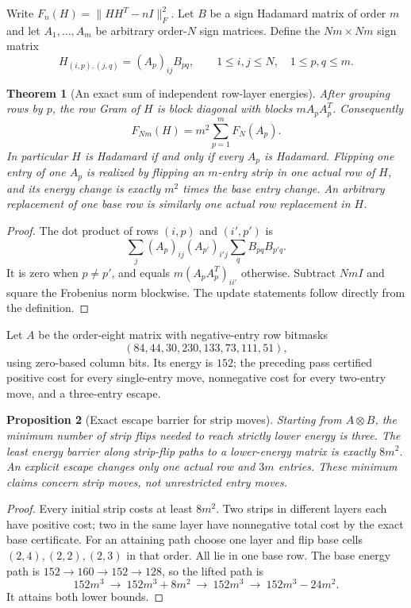 \documentclass[11pt]{article}
\newtheorem{theorem}{Theorem}[section]
\newtheorem{proposition}[theorem]{Proposition}
\begin{document}
Write $F_n(H)=\|HH^T-nI\|_F^2$. Let $B$ be a sign Hadamard matrix of
order $m$ and let $A_1,\ldots,A_m$ be arbitrary order-$N$ sign matrices.
Define the $Nm\times Nm$ sign matrix
\[
 H_{(i,p),(j,q)}=(A_p)_{ij}B_{pq},\qquad
 1\le i,j\le N,\quad1\le p,q\le m.
\]
\begin{theorem}[An exact sum of independent row-layer energies]
\label{thm:exchanges-layer-energy}
After grouping rows by $p$, the row Gram of $H$ is block diagonal with
blocks $mA_pA_p^T$. Consequently
\[
 F_{Nm}(H)=m^2\sum_{p=1}^m F_N(A_p).
\]
In particular $H$ is Hadamard if and only if every $A_p$ is Hadamard.
Flipping one entry of one $A_p$ is realized by flipping an $m$-entry
strip in one actual row of $H$, and its energy change is exactly
$m^2$ times the base entry change. An arbitrary replacement of one base
row is similarly one actual row replacement in $H$.
\end{theorem}
\begin{proof}
The dot product of rows $(i,p)$ and $(i',p')$ is
\[
 \sum_j(A_p)_{ij}(A_{p'})_{i'j}\sum_qB_{pq}B_{p'q}.
\]
It is zero when $p\ne p'$, and equals $m(A_pA_p^T)_{ii'}$ otherwise.
Subtract $NmI$ and square the Frobenius norm blockwise.
The update statements follow directly from the definition.
\end{proof}

Let $A$ be the order-eight matrix with negative-entry row bitmasks
\[
 (84,44,30,230,133,73,111,51),
\]
using zero-based column bits. Its energy is $152$; the preceding pass
certified positive cost for every single-entry move, nonnegative cost
for every two-entry move, and a three-entry escape.
\begin{proposition}[Exact escape barrier for strip moves]
\label{prop:exchanges-strip-barrier}
Starting from $A\otimes B$, the minimum number of strip flips needed
to reach strictly lower energy is three. The least energy barrier along
strip-flip paths to a lower-energy matrix is exactly $8m^2$.
An explicit escape changes only one actual row and $3m$ entries.
These minimum claims concern strip moves, not unrestricted entry moves.
\end{proposition}
\begin{proof}
Every initial strip costs at least $8m^2$. Two strips in different layers
each have positive cost; two in the same layer have nonnegative total
cost by the exact base certificate. For an attaining path choose one
layer and flip base cells $(2,4),(2,2),(2,3)$ in that order. All lie in
one base row. The base energy path is
$152\to160\to152\to128$, so the lifted path is
\[
 152m^3\ \longrightarrow\ 152m^3+8m^2\
 \longrightarrow\ 152m^3\
 \longrightarrow\ 152m^3-24m^2.
\]
It attains both lower bounds.
\end{proof}
\end{document}
